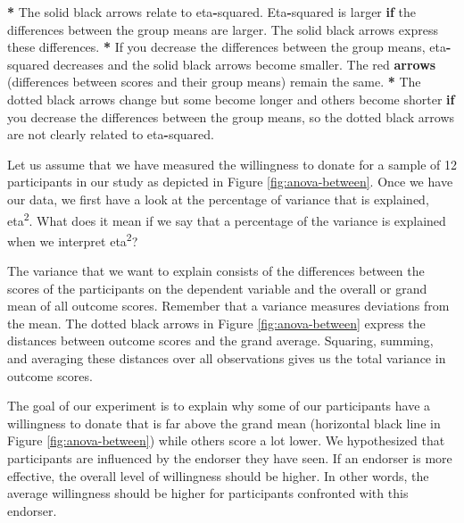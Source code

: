 \documentclass[a4paper]{book}
\newenvironment{Shaded}{\begin{snugshade}}{\end{snugshade}}
\newcommand{\KeywordTok}[1]{\textcolor[rgb]{0,0,0}{\textbf{#1}}}
\newcommand{\StringTok}[1]{\textcolor[rgb]{0.00,0.00,0.00}{#1}}
\newcommand{\ControlFlowTok}[1]{\textcolor[rgb]{0.00,0.00,0.00}{\textbf{#1}}}
\newcommand{\OperatorTok}[1]{\textcolor[rgb]{0.00,0.00,0.00}{\textbf{#1}}}
\newcommand{\NormalTok}[1]{#1}
\theoremstyle{definition}
\theoremstyle{definition}
\theoremstyle{definition}
\theoremstyle{remark}
\begin{document}
\begin{Shaded}
\begin{Highlighting}[]
\OperatorTok{*}\StringTok{ }\NormalTok{The solid black arrows relate to eta}\OperatorTok{-}\NormalTok{squared. Eta}\OperatorTok{-}\NormalTok{squared is larger }\ControlFlowTok{if}\NormalTok{ the}
\NormalTok{differences between the group means are larger. The solid black arrows express}
\NormalTok{these differences.}
\OperatorTok{*}\StringTok{ }\NormalTok{If you decrease the differences between the group means, eta}\OperatorTok{-}\NormalTok{squared}
\NormalTok{decreases and the solid black arrows become smaller. The red }\KeywordTok{arrows}\NormalTok{ (differences}
\NormalTok{between scores and their group means) remain the same.}
\OperatorTok{*}\StringTok{ }\NormalTok{The dotted black arrows change but some become longer and others become}
\NormalTok{shorter }\ControlFlowTok{if}\NormalTok{ you decrease the differences between the group means, so the}
\NormalTok{dotted black arrows are not clearly related to eta}\OperatorTok{-}\NormalTok{squared.}
\end{Highlighting}
\end{Shaded}

Let us assume that we have measured the willingness to donate for a
sample of 12 participants in our study as depicted in Figure
\ref{fig:anova-between}. Once we have our data, we first have a look at
the percentage of variance that is explained, eta\textsuperscript{2}.
What does it mean if we say that a percentage of the variance is
explained when we interpret eta\textsuperscript{2}?

The variance that we want to explain consists of the differences between
the scores of the participants on the dependent variable and the overall
or grand mean of all outcome scores. Remember that a variance measures
deviations from the mean. The dotted black arrows in Figure
\ref{fig:anova-between} express the distances between outcome scores and
the grand average. Squaring, summing, and averaging these distances over
all observations gives us the total variance in outcome scores.

The goal of our experiment is to explain why some of our participants
have a willingness to donate that is far above the grand mean
(horizontal black line in Figure \ref{fig:anova-between}) while others
score a lot lower. We hypothesized that participants are influenced by
the endorser they have seen. If an endorser is more effective, the
overall level of willingness should be higher. In other words, the
average willingness should be higher for participants confronted with
this endorser.
\end{document}
